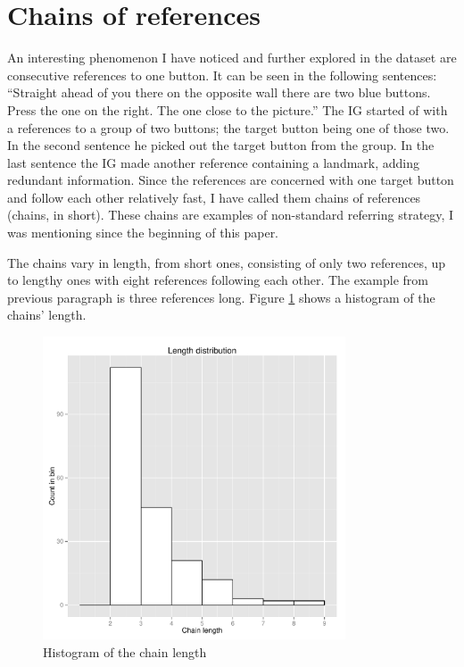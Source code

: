 \section{Chains of references}
\label{sec:dataset-chains}
An interesting phenomenon I have noticed and further explored in the dataset are consecutive references to one button. It can be seen in the following sentences: ``Straight ahead of you there on the opposite wall there are two blue buttons. Press the one on the right. The one close to the picture.'' The IG started of with a references to a group of two buttons; the target button being one of those two. In the second sentence he picked out the target button from the group. In the last sentence the IG made another reference containing a landmark, adding redundant information. Since the references are concerned with one target button and follow each other relatively fast, I have called them chains of references (chains, in short). These chains are examples of non-standard referring strategy, I was mentioning since the beginning of this paper.

The chains vary in length, from short ones, consisting of only two references, up to lengthy ones with eight references following each other. The example from previous paragraph is three references long. Figure \ref{fig:chains_len_histo} shows a histogram of the chains' length.

\begin{figure}[!htbp]
  \centering
	\includegraphics[width=0.8\textwidth]{Images/chains_len_histo}
	\caption{Histogram of the chain length}
	\label{fig:chains_len_histo}
\end{figure}

